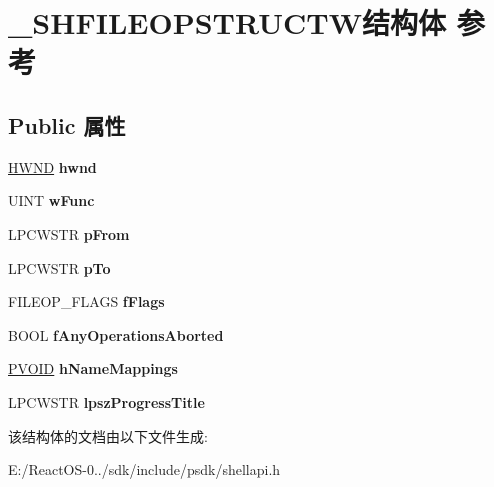 \hypertarget{struct___s_h_f_i_l_e_o_p_s_t_r_u_c_t_w}{}\section{\+\_\+\+S\+H\+F\+I\+L\+E\+O\+P\+S\+T\+R\+U\+C\+T\+W结构体 参考}
\label{struct___s_h_f_i_l_e_o_p_s_t_r_u_c_t_w}
\subsection*{Public 属性}
\begin{DoxyCompactItemize}
\item 
\mbox{\label{struct___s_h_f_i_l_e_o_p_s_t_r_u_c_t_w_a4bc934d254fdff0fa41e307b31853437}} 
\hyperlink{interfacevoid}{H\+W\+ND} {\bfseries hwnd}
\item 
\mbox{\label{struct___s_h_f_i_l_e_o_p_s_t_r_u_c_t_w_a9c7cb076925842f38d9e805df5567a06}} 
U\+I\+NT {\bfseries w\+Func}
\item 
\mbox{\label{struct___s_h_f_i_l_e_o_p_s_t_r_u_c_t_w_a328002457a7b350e20b97347346fb140}} 
L\+P\+C\+W\+S\+TR {\bfseries p\+From}
\item 
\mbox{\label{struct___s_h_f_i_l_e_o_p_s_t_r_u_c_t_w_aad28ba4ad15b074c32e4293070fa3506}} 
L\+P\+C\+W\+S\+TR {\bfseries p\+To}
\item 
\mbox{\label{struct___s_h_f_i_l_e_o_p_s_t_r_u_c_t_w_ae3427f2b892b3810963da2751021807e}} 
F\+I\+L\+E\+O\+P\+\_\+\+F\+L\+A\+GS {\bfseries f\+Flags}
\item 
\mbox{\label{struct___s_h_f_i_l_e_o_p_s_t_r_u_c_t_w_a62176fb0f7e6bce174a938cc51fb8628}} 
B\+O\+OL {\bfseries f\+Any\+Operations\+Aborted}
\item 
\mbox{\label{struct___s_h_f_i_l_e_o_p_s_t_r_u_c_t_w_a300cc5b12356d87473b177217fe944c1}} 
\hyperlink{interfacevoid}{P\+V\+O\+ID} {\bfseries h\+Name\+Mappings}
\item 
\mbox{\label{struct___s_h_f_i_l_e_o_p_s_t_r_u_c_t_w_af8cb1884b5cdffd879dd509d3a568850}} 
L\+P\+C\+W\+S\+TR {\bfseries lpsz\+Progress\+Title}
\end{DoxyCompactItemize}


该结构体的文档由以下文件生成\+:\begin{DoxyCompactItemize}
\item 
E\+:/\+React\+O\+S-\/0../sdk/include/psdk/shellapi.\+h\end{DoxyCompactItemize}
